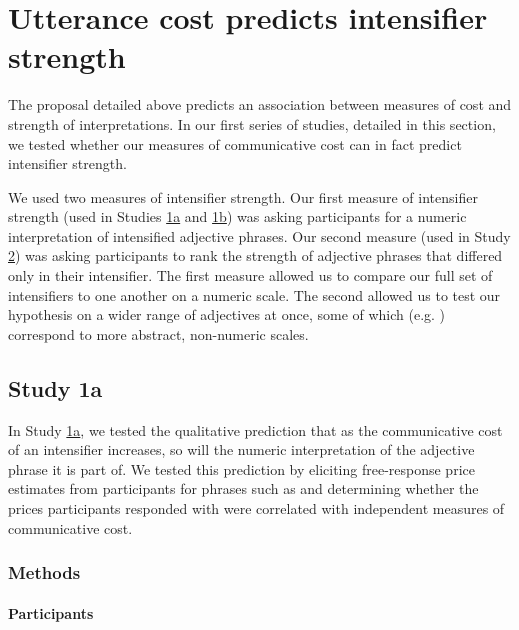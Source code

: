 \section{Utterance cost predicts intensifier strength}

The proposal detailed above predicts an association between measures of cost and strength of interpretations.
In our first series of studies, detailed in this section, we tested whether our measures of communicative cost can in fact predict intensifier strength.%

We used two measures of intensifier strength.
Our first measure of intensifier strength (used in Studies \hyperref[sec:study1a]{1a} and \hyperref[sec:study1b]{1b}) was asking participants for a numeric interpretation of intensified adjective phrases.
Our second measure (used in Study \hyperref[sec:study2]{2}) was asking participants to rank the strength of adjective phrases that differed only in their intensifier.
The first measure allowed us to compare our full set of intensifiers to one another on a numeric scale.
The second allowed us to test our hypothesis on a wider range of adjectives at once, some of which (e.g. ) correspond to more abstract, non-numeric scales.

\subsection{Study 1a \label{sec:study1a}}

In Study \hyperref[sec:study1a]{1a}, we tested the qualitative prediction that as the communicative cost of an intensifier increases, so will the numeric interpretation of the adjective phrase it is part of.
We tested this prediction by eliciting free-response price estimates from participants for phrases such as  and determining whether the prices participants responded with were correlated with independent measures of communicative cost.

\subsubsection{Methods}

\paragraph{Participants}

